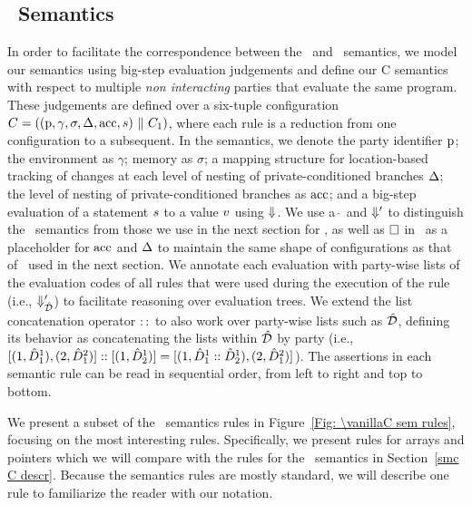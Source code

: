 

\subsection{\vanillaC\ Semantics} \label{van C descr}


% 
% 
In order to facilitate the correspondence between the \vanillaC\ and \piccoC\ semantics, we model our semantics using big-step evaluation judgements and define our C semantics with respect
to multiple {\em non interacting} parties that evaluate the same program. 
These judgements are defined over a six-tuple configuration $C = ((\mathrm{{p}}, \gamma, \sigma, \Delta, \mathrm{acc}, s) \-\ \Vert\  C_1)$, where each rule is a reduction from one configuration to a subsequent. 
In the semantics, we denote the party identifier $\mathrm{{p}}$;
the environment as $\gamma$; 
memory as $\sigma$;
a mapping structure for location-based tracking of changes at each level of nesting of private-conditioned branches $\Delta$;
the level of nesting of private-conditioned branches as $\mathrm{acc}$; and
a big-step evaluation of a statement $s$ to a value $v$ using $\Downarrow$.  
We use a $\hat{\ }$ and $\Downarrow'$ to distinguish the \vanillaC\ semantics from those we use in the next section for \piccoC, as well as $\Box$ in \vanillaC\ as a placeholder for $\mathrm{acc}$ and $\Delta$ to maintain the same shape of configurations as that of \piccoC\ used in the next section. 
We annotate each evaluation with party-wise lists of the evaluation codes of all rules that were used during the execution of the rule (i.e., $\Downarrow'_{\hat{\mathcal{D}}}$) to facilitate reasoning over evaluation trees. 
We extend the list concatenation operator $::$ to also work over party-wise lists such as $\hat{\mathcal{D}}$, defining its behavior as concatenating the lists within $\hat{\mathcal{D}}$ by party (i.e., $[(1, \hat{D}^1_1), (2, \hat{D}^2_1)]::[(1,\hat{D}^1_2)] = [(1, \hat{D}^1_1::\hat{D}^1_2), (2, \hat{D}^2_1)]$). 
The assertions in each semantic rule can be read in sequential order, from left to right and top to bottom. 

We present a subset of  the \vanillaC\ semantics  rules in Figure~\ref{Fig: \vanillaC
  sem rules}, focusing on the most interesting rules. Specifically, we present rules for arrays and pointers
which we will compare with the rules for the
\piccoC\ semantics in Section~\ref{smc C descr}. Because the semantics
rules are mostly standard, we will describe one rule to familiarize 
the reader with our notation. 


